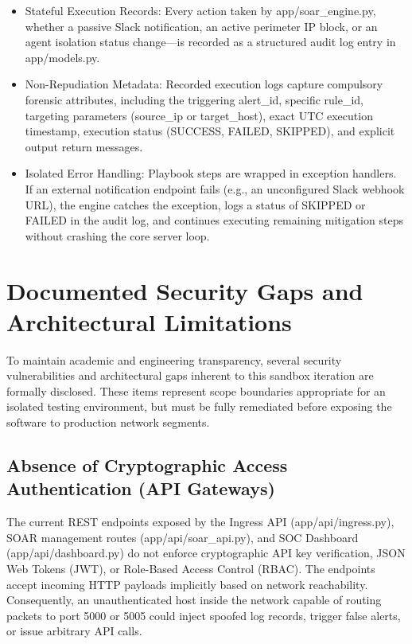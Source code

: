 \begin{itemize}
  \item Stateful Execution Records: Every action taken by app/soar\_engine.py, whether a passive Slack notification, an active perimeter IP block, or an agent isolation status change—is recorded as a structured audit log entry in app/models.py.
  \item Non-Repudiation Metadata: Recorded execution logs capture compulsory forensic attributes, including the triggering alert\_id, specific rule\_id, targeting parameters (source\_ip or target\_host), exact UTC execution timestamp, execution status (SUCCESS, FAILED, SKIPPED), and explicit output return messages.
  \item Isolated Error Handling: Playbook steps are wrapped in exception handlers. If an external notification endpoint fails (e.g., an unconfigured Slack webhook URL), the engine catches the exception, logs a status of SKIPPED or FAILED in the audit log, and continues executing remaining mitigation steps without crashing the core server loop.
\end{itemize}

\section{Documented Security Gaps and Architectural Limitations}

To maintain academic and engineering transparency, several security vulnerabilities and architectural gaps inherent to this sandbox iteration are formally disclosed. These items represent scope boundaries appropriate for an isolated testing environment, but must be fully remediated before exposing the software to production network segments.

\subsection{Absence of Cryptographic Access Authentication (API Gateways)}

The current REST endpoints exposed by the Ingress API (app/api/ingress.py), SOAR management routes (app/api/soar\_api.py), and SOC Dashboard (app/api/dashboard.py) do not enforce cryptographic API key verification, JSON Web Tokens (JWT), or Role-Based Access Control (RBAC). The endpoints accept incoming HTTP payloads implicitly based on network reachability. Consequently, an unauthenticated host inside the network capable of routing packets to port 5000 or 5005 could inject spoofed log records, trigger false alerts, or issue arbitrary API calls.

